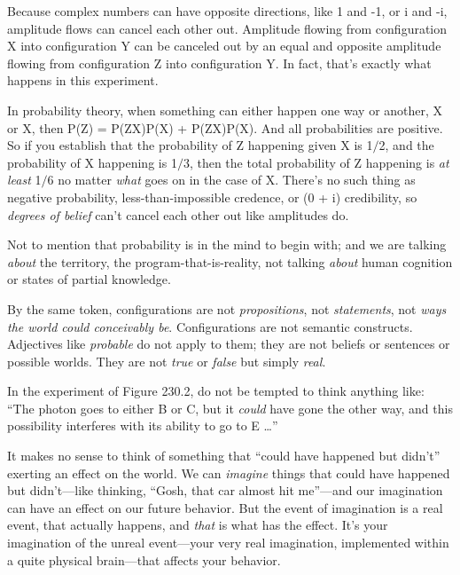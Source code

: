 {
 Because complex numbers can have opposite directions, like 1 and
-1, or i and -i, amplitude flows can cancel each other out. Amplitude
flowing from configuration X into configuration Y can be canceled out
by an equal and opposite amplitude flowing from configuration Z into
configuration Y. In fact, that's exactly what happens
in this experiment.}

{
 In probability theory, when something can either happen one way or
another, X or {\textlnot}X, then P(Z) = P(Z{\textbar}X)P(X) +
P(Z{\textbar}{\textlnot}X)P({\textlnot}X). And all probabilities are
positive. So if you establish that the probability of Z happening given
X is 1$/$2, and the probability of X happening is 1$/$3, then the total
probability of Z happening is \textit{at least} 1$/$6 no matter
\textit{what} goes on in the case of {\textlnot}X.
There's no such thing as negative probability,
less-than-impossible credence, or (0 + i) credibility, so
\textit{degrees of belief} can't cancel each other out
like amplitudes do.}

{
 Not to mention that probability is in the mind to begin with; and
we are talking \textit{about} the territory, the
program-that-is-reality, not talking \textit{about} human cognition or
states of partial knowledge.}

{
 By the same token, configurations are not \textit{propositions},
not \textit{statements}, not \textit{ways the world could conceivably
be}. Configurations are not semantic constructs. Adjectives like
\textit{probable} do not apply to them; they are not beliefs or
sentences or possible worlds. They are not \textit{true} or
\textit{false} but simply \textit{real}.}

{
 In the experiment of Figure 230.2, do not be tempted to think
anything like: ``The photon goes to either B or C, but
it \textit{could} have gone the other way, and this possibility
interferes with its ability to go to E \ldots''}

{
 It makes no sense to think of something that
``could have happened but
didn't'' exerting an effect on the
world. We can \textit{imagine} things that could have happened but
didn't---like thinking, ``Gosh, that
car almost hit me''---and our imagination can have an
effect on our future behavior. But the event of imagination is a real
event, that actually happens, and \textit{that} is what has the effect.
It's your imagination of the unreal event---your very
real imagination, implemented within a quite physical brain---that
affects your behavior.}


